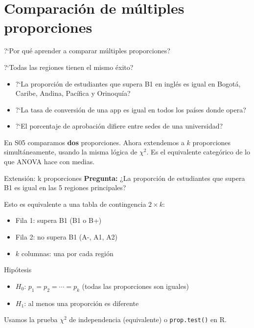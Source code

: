 \documentclass[aspectratio=169, 11pt]{beamer}
\begin{document}
\section{Comparación de múltiples proporciones}

\begin{frame}{?`Por qu\'e aprender a comparar m\'ultiples proporciones?}
\small
\begin{exampleblock}{?`Todas las regiones tienen el mismo \'exito?}
\begin{itemize}\setlength{\itemsep}{2pt}
  \item ?`La proporci\'on de estudiantes que supera B1 en ingl\'es es igual en Bogot\'a, Caribe, Andina, Pac\'ifica y Orinoqu\'ia?
  \item ?`La tasa de conversi\'on de una app es igual en todos los pa\'ises donde opera?
  \item ?`El porcentaje de aprobaci\'on difiere entre sedes de una universidad?
\end{itemize}
\end{exampleblock}

\vspace{0.2cm}
En S05 comparamos \textbf{dos} proporciones. Ahora extendemos a \alert{$k$} proporciones simult\'aneamente, usando la misma l\'ogica de $\chi^2$. Es el equivalente categ\'orico de lo que ANOVA hace con medias.
\end{frame}

\begin{frame}{Extensión: k proporciones}
\textbf{Pregunta:} ¿La proporción de estudiantes que supera B1 es igual en las 5 regiones principales?

\vspace{0.2cm}
Esto es equivalente a una tabla de contingencia $2 \times k$:
\begin{itemize}
  \item Fila 1: supera B1 (B1 o B+)
  \item Fila 2: no supera B1 (A-, A1, A2)
  \item $k$ columnas: una por cada región
\end{itemize}

\vspace{0.2cm}
\begin{block}{Hipótesis}
\begin{itemize}
  \item $H_0$: $p_1 = p_2 = \cdots = p_k$ (todas las proporciones son iguales)
  \item $H_1$: al menos una proporción es diferente
\end{itemize}
\end{block}

\vspace{0.2cm}
Usamos la prueba $\chi^2$ de independencia (equivalente) o \texttt{prop.test()} en R.
\end{frame}
\end{document}
